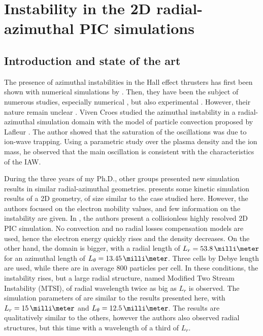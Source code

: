 
\section{Instability in the \acs{2D} radial-azimuthal \acs{PIC} simulations}
  \label{sec-PIC-ECDI}
  
  \subsection{Introduction and state of the art} \label{subsec-indroECDI}
        
    The presence of azimuthal instabilities in the Hall effect thrusters has first been shown with numerical simulations by \citet{adam2004}.
    Then, they have been the subject of numerous studies, especially numerical \citep{ducrocq2006,lafleur2016,lafleur2016a,croes2017,croes2018,janhunen2018,taccogna2019}, but also experimental \citep{honore2011,cavalier2013,cavalier2013a}.
    However, their nature remain unclear \citep{boeuf2018}.
    Viven Croes studied the azimuthal instability in a radial-azimuthal simulation domain with the model of particle convection proposed by Lafleur \citep{croes2017,croes2018}.
    The author showed that the saturation of the oscillations was due to ion-wave trapping.
    Using a parametric study over the plasma density and the ion mass, he observed that the main oscillation is consistent with the characteristics of the \ac{IAW}.
    
    During the three years of my Ph.D., other groups presented new simulation results in similar radial-azimuthal geometries.
    \citet{hara2019a} presents some kinetic simulation results of a \ac{2D} geometry, of size similar to the case studied here.
    However, the authors focused on the electron mobility values, and few information on the instability are given.
    In \citet{janhunen2018}, the authors present a collisionless highly resolved \ac{2D} \ac{PIC} simulation.
    No convection and no radial losses compensation models are used, hence the electron energy quickly rises and the density decreases.
    On the other hand, the domain is bigger, with a radial length of $L_r = 53.8\,\milli\meter$ for an azimuthal length of $L_{\theta} = 13.45 \,\milli\meter$.
    Three cells by Debye length are used, while there are in average 800 particles per cell.
    In these conditions, the instability rises, but a large radial structure, named Modified Two Stream Instability (MTSI), of radial wavelength twice as big as $L_r$  is observed.
    The simulation parameters of \citet{taccogna2019} are similar to the results presented here, with  $L_r = 15\,\milli\meter$ and $L_{\theta} = 12.5 \,\milli\meter$.
    The results are qualitatively similar to the others, however the authors also observed radial structures, but this time with a wavelength of a third of $L_r$.
        
